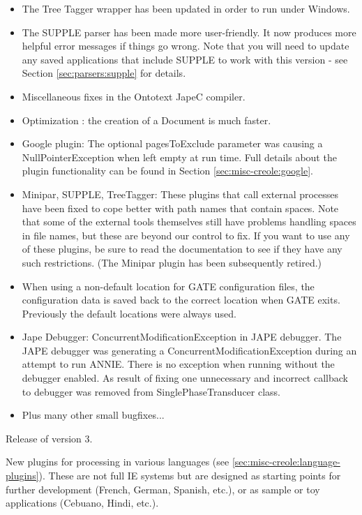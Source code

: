 \begin{itemize}
\item The Tree Tagger wrapper has been updated in order to run under Windows.
\item The SUPPLE parser has been made more user-friendly.  It now produces more
helpful error messages if things go wrong.  Note that you will need to update
any saved applications that include SUPPLE to work with this version - see
Section \ref{sec:parsers:supple} for details.
\item Miscellaneous fixes in the Ontotext JapeC compiler.
\item Optimization : the creation of a Document is much faster.
\item Google plugin: The optional pagesToExclude parameter was causing a
  NullPointerException when left empty at run time. Full details about the
  plugin functionality can be found in Section \ref{sec:misc-creole:google}.
\item Minipar, SUPPLE, TreeTagger: These plugins that call external processes
  have been fixed to cope better with path names that contain spaces.  Note that
  some of the external tools themselves still have problems handling spaces in
  file names, but these are beyond our control to fix.  If you want to use any
  of these plugins, be sure to read the documentation to see if they have any
  such restrictions.  (The Minipar plugin has been subsequently retired.)
\item When using a non-default location for GATE configuration files, the
  configuration data is saved back to the correct location when GATE exits.
  Previously the default locations were always used.
\item Jape Debugger:  ConcurrentModificationException in JAPE debugger.
  The JAPE debugger was generating a ConcurrentModificationException during an
  attempt to run ANNIE. There is no exception when running without the debugger
  enabled. As result of fixing one unnecessary and incorrect callback to
  debugger was removed from SinglePhaseTransducer class.
\item Plus many other small bugfixes...
\end{itemize}


Release of version 3.

New plugins for processing in various languages (see
\ref{sec:misc-creole:language-plugins}). These are not full IE systems but are
designed as starting points for further development (French, German, Spanish,
etc.), or as sample or toy applications (Cebuano, Hindi, etc.).

